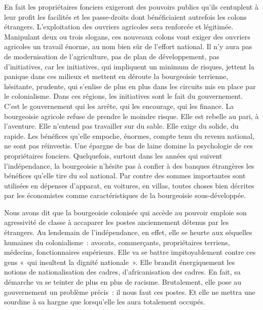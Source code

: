 \documentclass[french,twoside]{book} %
\begin{document}
En fait les propriétaires fonciers exigeront des pouvoirs publics qu’ils centuplent à leur profit les facilités et les passe-droits dont bénéficiaient autrefois les colons étrangers. L’exploitation des ouvriers agricoles sera renforcée et légitimée. Manipulant deux ou trois slogans, ces nouveaux colons vont exiger des ouvriers agricoles un travail énorme, au nom bien sûr de l’effort national. Il n’y aura pas de modernisation de l’agriculture, pas de plan de développement, pas d’initiatives, car les initiatives, qui impliquent un minimum de risques, jettent la panique dans ces milieux et mettent en déroute la bourgeoisie terrienne, hésitante, prudente, qui s’enlise de plus en plus dans les circuits mis en place par le colonialisme. Dans ces régions, les initiatives sont le fait du gouvernement. C’est le gouvernement   qui les arrête, qui les encourage, qui les finance. La bourgeoisie agricole refuse de prendre le moindre risque. Elle est rebelle au pari, à l’aventure. Elle n’entend pas travailler sur du sable. Elle exige du solide, du rapide. Les bénéfices qu’elle empoche, énormes, compte tenu du revenu national, ne sont pas réinvestis. Une épargne de bas de laine domine la psychologie de ces propriétaires fonciers. Quelquefois, surtout dans les années qui suivent l’indépendance, la bourgeoisie n’hésite pas à confier à des banques étrangères les bénéfices qu’elle tire du sol national. Par contre des sommes importantes sont utilisées en dépenses d’apparat, en voitures, en villas, toutes choses bien décrites par les économistes comme caractéristiques de la bourgeoisie sous-développée.\par
\bigbreak
\noindent Nous avons dit que la bourgeoisie colonisée qui accède au pouvoir emploie son agressivité de classe à accaparer les postes anciennement détenus par les étrangers. Au lendemain de l’indépendance, en effet, elle se heurte aux séquelles humaines du colonialisme : avocats, commerçants, propriétaires terriens, médecins, fonctionnaires supérieurs. Elle va se battre impitoyablement contre ces gens « qui insultent la dignité nationale ». Elle brandit énergiquement les notions de nationalisation des cadres, d’africanisation des cadres. En fait, sa démarche va se teinter de plus en plus de racisme. Brutalement, elle pose au gouvernement un problème précis : il nous faut ces postes. Et elle ne mettra une sourdine à sa hargne que lorsqu’elle les aura totalement occupés.\par
\end{document}
